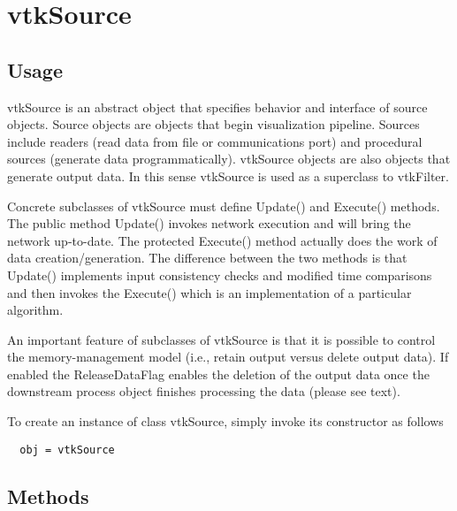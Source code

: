 \section{vtkSource}

\subsection{Usage}

 vtkSource is an abstract object that specifies behavior and interface
 of source objects. Source objects are objects that begin visualization
 pipeline. Sources include readers (read data from file or communications
 port) and procedural sources (generate data programmatically). vtkSource 
 objects are also objects that generate output data. In this sense
 vtkSource is used as a superclass to vtkFilter.

 Concrete subclasses of vtkSource must define Update() and Execute() 
 methods. The public method Update() invokes network execution and will
 bring the network up-to-date. The protected Execute() method actually
 does the work of data creation/generation. The difference between the two
 methods is that Update() implements input consistency checks and modified
 time comparisons and then invokes the Execute() which is an implementation 
 of a particular algorithm.

 An important feature of subclasses of vtkSource is that it is possible 
 to control the memory-management model (i.e., retain output versus delete
 output data). If enabled the ReleaseDataFlag enables the deletion of the
 output data once the downstream process object finishes processing the
 data (please see text).

To create an instance of class vtkSource, simply
invoke its constructor as follows
\begin{verbatim}
  obj = vtkSource
\end{verbatim}
\subsection{Methods}

